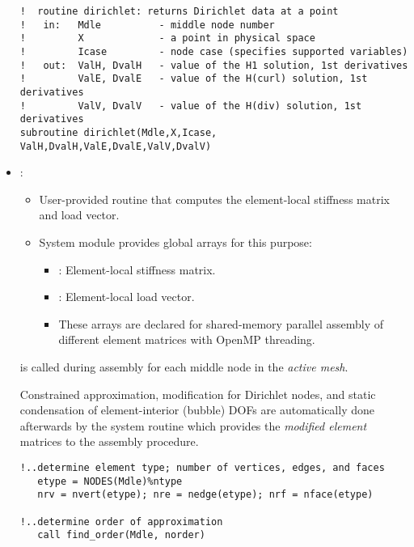 \begin{itemize}
{\begin{lstlisting}[caption=\file{POISSON/GALERKIN/common/}\routine{dirichlet} routine.]
!  routine dirichlet: returns Dirichlet data at a point
!   in:   Mdle          - middle node number
!         X             - a point in physical space
!         Icase         - node case (specifies supported variables)
!   out:  ValH, DvalH   - value of the H1 solution, 1st derivatives
!         ValE, DvalE   - value of the H(curl) solution, 1st derivatives
!         ValV, DvalV   - value of the H(div) solution, 1st derivatives
subroutine dirichlet(Mdle,X,Icase, ValH,DvalH,ValE,DvalE,ValV,DvalV)
\end{lstlisting}
	}
	\item
	{:
	\begin{itemize}
	\item User-provided routine that computes the element-local stiffness matrix and load vector.
	\item System module  provides global arrays for this purpose:
	\begin{itemize}
		\item {}: Element-local stiffness matrix.
		\item {}: Element-local load vector.
		\item These arrays are declared  for shared-memory parallel assembly of different element matrices with OpenMP threading.
	\end{itemize}
\end{itemize}

 is called during assembly for each middle node  in the \emph{active mesh}.

\begin{remark}
Constrained approximation, modification for Dirichlet nodes, and static condensation of element-interior (bubble) DOFs are automatically done afterwards by the system routine  which provides the \emph{modified element} matrices to the assembly procedure.
\end{remark}

\begin{lstlisting}[mathescape,caption=\file{POISSON/GALERKIN/}\routine{elem} routine]
!..determine element type; number of vertices, edges, and faces
   etype = NODES(Mdle)%ntype
   nrv = nvert(etype); nre = nedge(etype); nrf = nface(etype)
   
!..determine order of approximation
   call find_order(Mdle, norder)
   

\end{lstlisting}}
\end{itemize}
